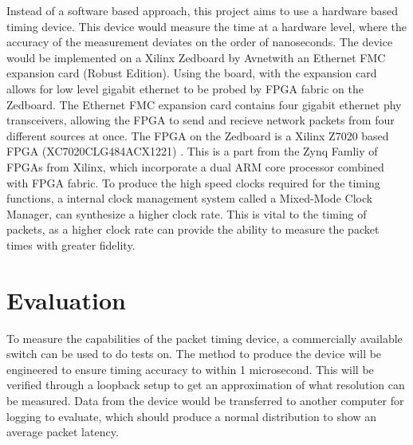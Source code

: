 \par Instead of a software based approach, this project aims to use a hardware based timing device.
This device would measure the time at a hardware level, where the accuracy of the measurement deviates on the order of nanoseconds.
The device would be implemented on a Xilinx Zedboard by Avnet\texttrademark with an Ethernet FMC expansion card (Robust Edition).
Using the board, with the expansion card allows for low level gigabit ethernet to be probed by FPGA fabric on the Zedboard.
The Ethernet FMC expansion card contains four gigabit ethernet phy transceivers, allowing the FPGA to send and recieve network packets from four different sources at once.
The FPGA on the Zedboard is a Xilinx Z7020 based FPGA (XC7020CLG484ACX1221) \cite{fpga}.
This is a part from the Zynq Famliy of FPGAs from Xilinx, which incorporate a dual ARM core processor combined with FPGA fabric.
To produce the high speed clocks required for the timing functions, a internal clock management system called a Mixed-Mode Clock Manager, can synthesize a higher clock rate.
This is vital to the timing of packets, as a higher clock rate can provide the ability to measure the packet times with greater fidelity.

\section{Evaluation}
To measure the capabilities of the packet timing device, a commercially available switch can be used to do tests on.
The method to produce the device will be engineered to ensure timing accuracy to within 1 microsecond.
This will be verified through a loopback setup to get an approximation of what resolution can be measured.
Data from the device would be transferred to another computer for logging to evaluate, which should produce a normal distribution to show an average packet latency.
